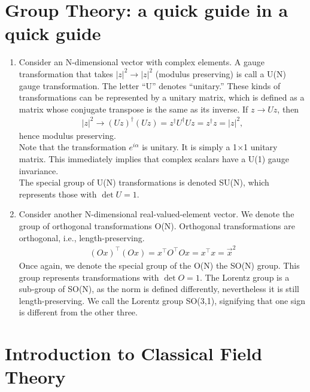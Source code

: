 \documentclass{book}
\numberwithin{equation}{section}
\theoremstyle{definition}
\begin{document}
\newpage
\chapter{Group Theory: a quick guide in a quick guide}
\begin{enumerate}
	\item Consider an N-dimensional vector with complex elements. A gauge transformation that takes $\vert z\vert^2 \to \vert z \vert^2$ (modulus preserving) is call a U(N) gauge transformation. The letter ``U'' denotes ``unitary.'' These kinds of transformations can be represented by a unitary matrix, which is defined as a matrix whose conjugate transpose is the same as its inverse. If $z\to Uz$, then 
	\begin{align}
	\vert z\vert^2 \to (Uz)^\dagger(Uz) = z^\dagger U^\dagger U z =z^\dagger z =\vert z\vert^2,
	\end{align} 
	hence modulus preserving.\\
	
	Note that the transformation $e^{i\alpha}$ is unitary. It is simply a 1$\times$1 unitary matrix. This immediately implies that complex scalars have a U(1) gauge invariance.\\
	
	The special group of U(N) transformations is denoted SU(N), which represents those with $\det U= 1$. 
	\item Consider another N-dimensional real-valued-element vector. We denote the group of orthogonal transformations O(N). Orthogonal transformations are orthogonal, i.e., length-preserving. 
	\begin{align}
	(Ox)^\top(Ox) = x^\top O^\top O x = x^\top x = \vec{x}^2
	\end{align} 
	Once again, we denote the special group of the O(N) the SO(N) group. This group represents transformations with $\det O = 1$. The Lorentz group is a sub-group of SO(N), as the norm is defined differently, nevertheless it is still length-preserving. We call the Lorentz group SO(3,1), signifying that one sign is different from the other three. 
\end{enumerate}



\newpage

\chapter{Introduction to Classical Field Theory}
\end{document}
